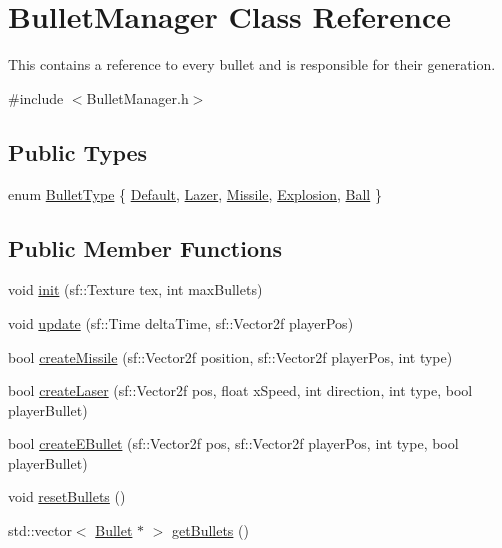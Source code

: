 \hypertarget{class_bullet_manager}{}\section{Bullet\+Manager Class Reference}
\label{class_bullet_manager}


This contains a reference to every bullet and is responsible for their generation.  




{\ttfamily \#include $<$Bullet\+Manager.\+h$>$}

\subsection*{Public Types}
\begin{DoxyCompactItemize}
\item 
enum \hyperlink{class_bullet_manager_af49df9c4e5e7d87c13f2660851090580}{Bullet\+Type} \{ \newline
\hyperlink{class_bullet_manager_af49df9c4e5e7d87c13f2660851090580aa2bdb1bfdc8ecf1b600662b51102ea94}{Default}, 
\hyperlink{class_bullet_manager_af49df9c4e5e7d87c13f2660851090580ae7a50fdc1ce316dca314744566086fa0}{Lazer}, 
\hyperlink{class_bullet_manager_af49df9c4e5e7d87c13f2660851090580aa91f791a74307837d20bbfdd29e31916}{Missile}, 
\hyperlink{class_bullet_manager_af49df9c4e5e7d87c13f2660851090580a1e6c03478820ae36f239253d3b389268}{Explosion}, 
\newline
\hyperlink{class_bullet_manager_af49df9c4e5e7d87c13f2660851090580a17cc0a9c129f28a8fb22c46083f14df4}{Ball}
 \}
\end{DoxyCompactItemize}
\subsection*{Public Member Functions}
\begin{DoxyCompactItemize}
\item 
void \hyperlink{class_bullet_manager_ac2c9ad28a04c73e29be6737bf0e65b2a}{init} (sf\+::\+Texture tex, int max\+Bullets)
\item 
void \hyperlink{class_bullet_manager_ad4a0ca5d80bc781ccc9af56b710839ba}{update} (sf\+::\+Time delta\+Time, sf\+::\+Vector2f player\+Pos)
\item 
bool \hyperlink{class_bullet_manager_acd15785d7e030d0aecb61c46933d4432}{create\+Missile} (sf\+::\+Vector2f position, sf\+::\+Vector2f player\+Pos, int type)
\item 
bool \hyperlink{class_bullet_manager_a17d3960ef84f421c8937ed80acd39a8d}{create\+Laser} (sf\+::\+Vector2f pos, float x\+Speed, int direction, int type, bool player\+Bullet)
\item 
bool \hyperlink{class_bullet_manager_a12fa23a4873b2deaab339059756db0c0}{create\+E\+Bullet} (sf\+::\+Vector2f pos, sf\+::\+Vector2f player\+Pos, int type, bool player\+Bullet)
\item 
void \hyperlink{class_bullet_manager_ab1087897ac75b114d15f237fa98420a3}{reset\+Bullets} ()
\item 
std\+::vector$<$ \hyperlink{class_bullet}{Bullet} $\ast$ $>$ \hyperlink{class_bullet_manager_a6222ba71ad273259dbdaa8030abcbe80}{get\+Bullets} ()
\end{DoxyCompactItemize}
